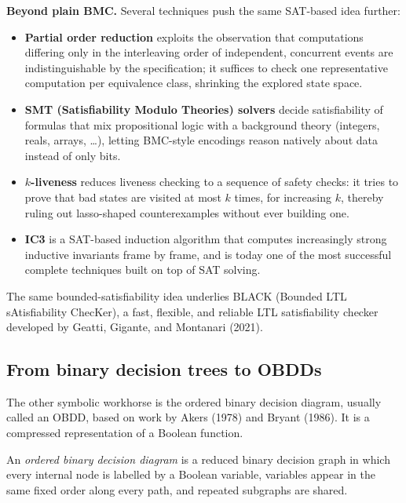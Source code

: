 \medskip\noindent
\textbf{Beyond plain BMC.}  Several techniques push the same SAT-based idea
further:
\begin{itemize}
  \item \textbf{Partial order reduction} exploits the observation that
        computations differing only in the interleaving order of
        independent, concurrent events are indistinguishable by the
        specification; it suffices to check one representative computation
        per equivalence class, shrinking the explored state space.
  \item \textbf{SMT (Satisfiability Modulo Theories) solvers} decide
        satisfiability of formulas that mix propositional logic with a
        background theory (integers, reals, arrays, \ldots), letting BMC-style
        encodings reason natively about data instead of only bits.
  \item \textbf{$k$-liveness} reduces liveness checking to a sequence of
        safety checks: it tries to prove that bad states are visited at most
        $k$ times, for increasing $k$, thereby ruling out lasso-shaped
        counterexamples without ever building one.
  \item \textbf{IC3} is a SAT-based induction algorithm that computes
        increasingly strong inductive invariants frame by frame, and is
        today one of the most successful complete techniques built on top of
        SAT solving.
\end{itemize}
The same bounded-satisfiability idea underlies \textsc{BLACK} (Bounded LTL
sAtisfiability ChecKer), a fast, flexible, and reliable LTL satisfiability
checker developed by Geatti, Gigante, and Montanari (2021).

\subsection{From binary decision trees to OBDDs}

The other symbolic workhorse is the ordered binary decision diagram, usually
called an OBDD, based on work by Akers (1978) and Bryant (1986).  It is a
compressed representation of a Boolean function.

\begin{definition}[OBDD]
An \emph{ordered binary decision diagram} is a reduced binary decision graph
in which every internal node is labelled by a Boolean variable, variables
appear in the same fixed order along every path, and repeated subgraphs are
shared.
\end{definition}

